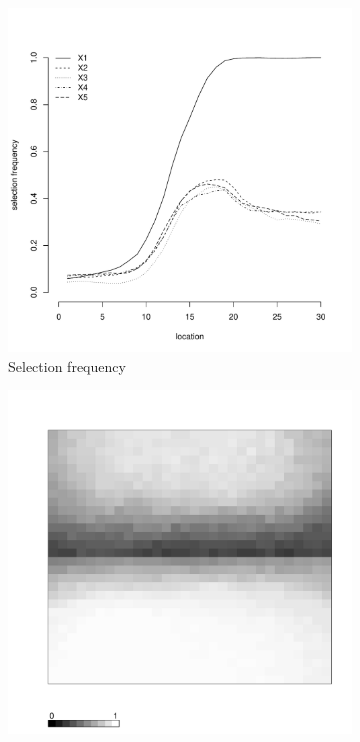 \documentclass[authoryear, review, 11pt]{elsarticle}
\begin{document}
\begin{figure}
\begin{subfigure}[b]{0.45\textwidth}
		\includegraphics[width=\textwidth]{../../figures/simulation/15.19.profile_selection.pdf}
		\caption{Selection frequency}
	\end{subfigure}
	\begin{subfigure}[b]{0.45\textwidth}
	\centering
		\includegraphics[width=\textwidth]{../../figures/simulation/X1.15.19.unshrunk_bootstrap_coverage.pdf}

\end{subfigure}
\end{figure}
\end{document}
